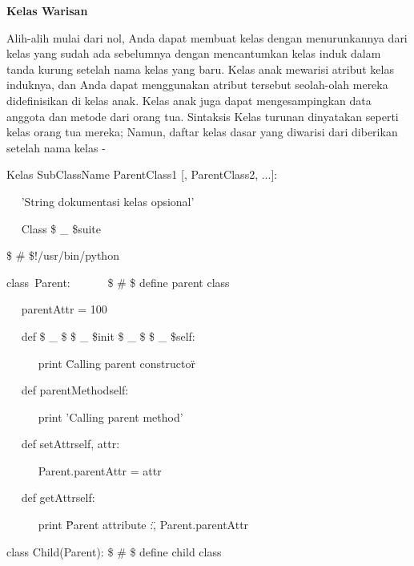 \begin{12pt}
\begin{12pt}
\begin{12pt}
\begin{12pt}
\begin{12pt}
\begin{12pt}
\begin{12pt}
\begin{12pt}
\begin{12pt}
\begin{12pt}
\begin{12pt}
\begin{12pt}
\begin{12pt}
\begin{12pt}
\begin{12pt}
\begin{12pt}
\vspace{12pt}
\vspace{12pt}
\noindent 
{\fontsize{14pt}{14pt}\selectfont \textbf{Kelas Warisan} \\} \par
\begin{12pt}
Alih-alih mulai dari nol, Anda dapat membuat kelas dengan menurunkannya dari kelas yang sudah ada sebelumnya dengan mencantumkan kelas induk dalam tanda kurung setelah nama kelas yang baru. Kelas anak mewarisi atribut kelas induknya, dan Anda dapat menggunakan atribut tersebut seolah-olah mereka didefinisikan di kelas anak. Kelas anak juga dapat mengesampingkan data anggota dan metode dari orang tua. Sintaksis Kelas turunan dinyatakan seperti kelas orang tua mereka; Namun, daftar kelas dasar yang diwarisi dari diberikan setelah nama kelas - \par
\vspace{12pt}
\noindent 
Kelas SubClassName {ParentClass1 [, ParentClass2, ...]}: \par
\noindent 
~~ 'String dokumentasi kelas opsional' \par
\noindent 
~~ Class \$  \_  \$suite \par
\noindent 
 \$  \#  \$!/usr/bin/python \par
\vspace{12pt}
\noindent 
class~Parent:~~~~~~   \$  \#  \$ define parent class \par
\noindent 
~~ parentAttr = 100 \par
\noindent 
~~ def  \$  \_  \$ \$  \_  \$init \$  \_  \$ \$  \_  \${self}: \par
\noindent 
~~~~~ print \"Calling parent constructor\" \par
\vspace{12pt}
\noindent 
~~ def parentMethod{self}: \par
\noindent 
~~~~~ print 'Calling parent method' \par
\begin{12pt}
\noindent 
~~ def setAttr{self, attr}: \par
\noindent 
~~~~~ Parent.parentAttr = attr \par
\begin{12pt}
\noindent 
~~ def getAttr{self}: \par
\noindent 
~~~~~ print \"Parent attribute :\", Parent.parentAttr \par
\vspace{12pt}
\noindent 
class Child(Parent):  \$  \#  \$ define child class \par

\end{12pt}
\end{12pt}
\end{12pt}
\end{12pt}
\end{12pt}
\end{12pt}
\end{12pt}
\end{12pt}
\end{12pt}
\end{12pt}
\end{12pt}
\end{12pt}
\end{12pt}
\end{12pt}
\end{12pt}
\end{12pt}
\end{12pt}
\end{12pt}
\end{12pt}
